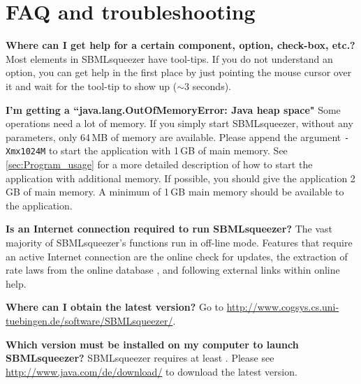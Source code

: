 \chapter{\acs{FAQ} and troubleshooting}
\label{ch:faq}


\noindent \textbf{Where can I get help for a certain component, option, check-box, etc.?}\newline
Most elements in SBMLsqueezer have tool-tips. If you do not understand an option, you
can get help in the first place by just pointing the mouse cursor over it and
wait for the tool-tip to show up ($\sim$3 seconds).\newline

\noindent \textbf{I'm getting a ``java.lang.OutOfMemoryError: Java heap space"}\newline
Some operations need a lot of memory. If you simply start SBMLsqueezer, without any
\JVM parameters, only 64\,MB of memory are available. Please append the argument
\texttt{-Xmx1024M} to start the application with 1\,GB of main memory. See
\vref{sec:Program_usage} for a more detailed description of how to
start the application with additional memory. If possible, you should give the
application 2\,GB of main memory. A minimum of 1\,GB main memory should be
available to the application.\newline

\noindent \textbf{Is an Internet connection required to run SBMLsqueezer?}\newline
The vast majority of SBMLsqueezer's functions run in off-line mode.
Features that require an active Internet connection are the online check for updates, the extraction of rate laws from the online database \SABIO, and following external links within online help.
\newline

\noindent \textbf{Where can I obtain the latest version?}\newline
Go to \url{http://www.cogsys.cs.uni-tuebingen.de/software/SBMLsqueezer/}.\newline

\noindent \textbf{Which \Java version must be installed on my computer to launch SBMLsqueezer?}\newline
SBMLsqueezer requires at least . Please see \url{http://www.java.com/de/download/} to download the latest \Java version.\newline

